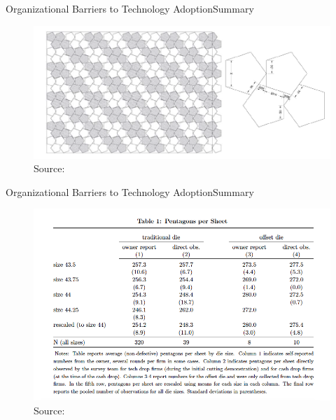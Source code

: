 \documentclass{beamer}
\begin{document}
\begin{frame}{Organizational Barriers to Technology Adoption}{Summary}
\begin{figure}[h]
\begin{centering}
  \includegraphics[width=\textwidth]{atkin2}
  \caption{Source: \cite{Atkin2015}}
   \label{fig:atkin2}
\end{centering}
\end{figure}
\end{frame}

\begin{frame}{Organizational Barriers to Technology Adoption}{Summary}
\begin{figure}[h]
\begin{centering}
  \includegraphics[width=\textwidth]{atkin3}
  \caption{Source: \cite{Atkin2015}}
   \label{fig:atkin3}
\end{centering}
\end{figure}
\end{frame}
\end{document}
